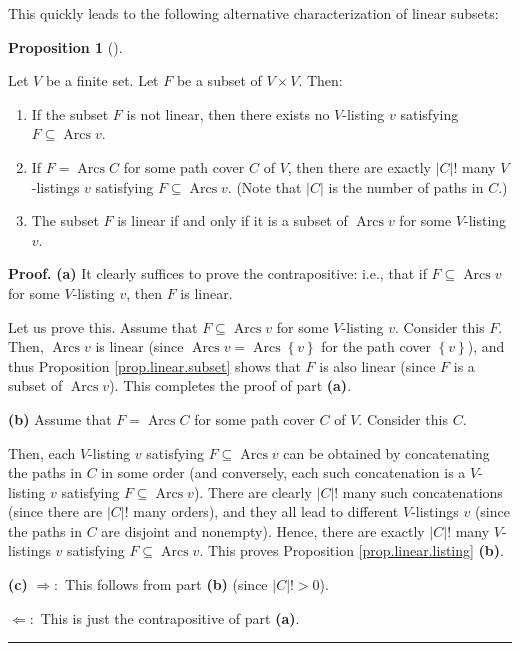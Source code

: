 \documentclass[numbers=enddot,12pt,final,onecolumn,notitlepage]{scrartcl}%
\numberwithin{exer}{section}
\theoremstyle{definition}
\newtheorem{prop}[theo]{Proposition}
\newenvironment{proposition}[1][]
{\begin{prop}[#1]\begin{leftbar}}
{\end{leftbar}\end{prop}}
\newenvironment{proof}[1][Proof]{\noindent\textbf{#1.} }{\ \rule{0.5em}{0.5em}}
\newenvironment{vershort}{}{}
\begin{document}
This quickly leads to the following alternative characterization of linear subsets:

\begin{proposition}
\label{prop.linear.listing}Let $V$ be a finite set. Let $F$ be a subset of
$V\times V$. Then:

\begin{enumerate}
\item[\textbf{(a)}] If the subset $F$ is not linear, then there exists no
$V$-listing $v$ satisfying $F\subseteq\operatorname*{Arcs}v$.

\item[\textbf{(b)}] If $F=\operatorname*{Arcs}C$ for some path cover $C$ of
$V$, then there are exactly $\left\vert C\right\vert !$ many $V$-listings $v$
satisfying $F\subseteq\operatorname*{Arcs}v$. (Note that $\left\vert
C\right\vert $ is the number of paths in $C$.)

\item[\textbf{(c)}] The subset $F$ is linear if and only if it is a subset of
$\operatorname*{Arcs}v$ for some $V$-listing $v$.
\end{enumerate}
\end{proposition}

\begin{vershort}


\begin{proof}
\textbf{(a)} It clearly suffices to prove the contrapositive: i.e., that if
$F\subseteq\operatorname*{Arcs}v$ for some $V$-listing $v$, then $F$ is linear.

Let us prove this. Assume that $F\subseteq\operatorname*{Arcs}v$ for some
$V$-listing $v$. Consider this $F$. Then, $\operatorname*{Arcs}v$ is linear
(since $\operatorname*{Arcs}v=\operatorname*{Arcs}\left\{  v\right\}  $ for
the path cover $\left\{  v\right\}  $), and thus Proposition
\ref{prop.linear.subset} shows that $F$ is also linear (since $F$ is a subset
of $\operatorname*{Arcs}v$). This completes the proof of part \textbf{(a)}.
\medskip

\textbf{(b)} Assume that $F=\operatorname*{Arcs}C$ for some path cover $C$ of
$V$. Consider this $C$.

Then, each $V$-listing $v$ satisfying $F\subseteq\operatorname*{Arcs}v$ can be
obtained by concatenating the paths in $C$ in some order (and conversely, each
such concatenation is a $V$-listing $v$ satisfying $F\subseteq
\operatorname*{Arcs}v$). There are clearly $\left\vert C\right\vert !$ many
such concatenations (since there are $\left\vert C\right\vert !$ many orders),
and they all lead to different $V$-listings $v$ (since the paths in $C$ are
disjoint and nonempty). Hence, there are exactly $\left\vert C\right\vert !$
many $V$-listings $v$ satisfying $F\subseteq\operatorname*{Arcs}v$. This
proves Proposition \ref{prop.linear.listing} \textbf{(b)}. \medskip

\textbf{(c)} $\Longrightarrow:$ This follows from part \textbf{(b)} (since
$\left\vert C\right\vert !>0$).

$\Longleftarrow:$ This is just the contrapositive of part \textbf{(a)}.
\end{proof}
\end{vershort}
\end{document}
